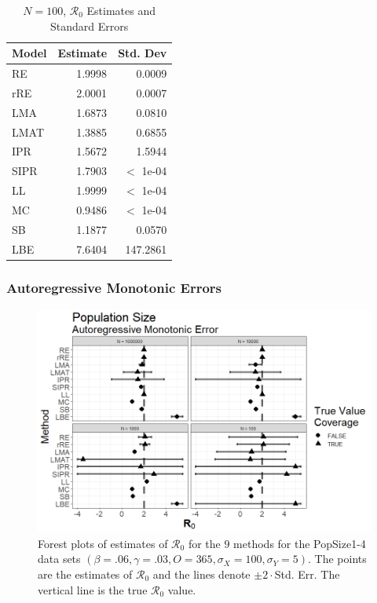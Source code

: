 \documentclass[12pt]{article}
\newcommand{\xxsir}{\ensuremath{9} } %
\newcommand{\rr}{\ensuremath{\mathcal{R}_0}}
\begin{document}
\begin{table}[H]
	
	\centering
	\begin{tabular}[t]{l|r|r}
		\hline
		Model & Estimate & Std. Dev\\
		\hline
		RE & 1.9998 & 0.0009\\
		\hline
		rRE & 2.0001 & 0.0007\\
		\hline
		LMA & 1.6873 & 0.0810\\
		\hline
		LMAT & 1.3885 & 0.6855\\
		\hline
		IPR & 1.5672 & 1.5944\\
		\hline
		SIPR & 1.7903 & $<$ 1e-04\\
		\hline
		LL & 1.9999 & $<$ 1e-04\\
		\hline
		MC & 0.9486 & $<$ 1e-04\\
		\hline
		SB & 1.1877 & 0.0570\\
		\hline
		LBE & 7.6404 & 147.2861\\
		\hline
	\end{tabular}
	\caption{$N = 100$, $\rr$ Estimates and Standard Errors}
\end{table}

\subsubsection{Autoregressive Monotonic Errors}

\begin{figure}[H]
	\centering
	\includegraphics[scale=0.5]{images/popsize_arm.tiff}
	\caption{Forest plots of estimates of $\rr$ for the \xxsir methods for the PopSize1-4 data sets $(\beta=.06, \gamma=.03, O=365, \sigma_X=100, \sigma_Y=5)$.  The points are the estimates of $\rr$ and the lines denote $\pm 2\cdot $Std. Err.  The vertical line is the true $\rr$ value.}
\end{figure}
\end{document}
